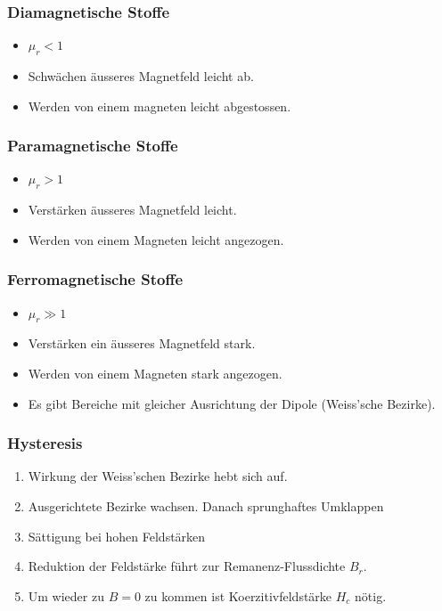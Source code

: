 \documentclass[10pt,a4paper]{scrartcl}
\begin{document}
\begin{multicols*}{3}
	\subsubsection{Diamagnetische Stoffe}
	
	\begin{itemize}
	\compaq
	\item
	$\mu_r<1$
	\item
	Schwächen äusseres Magnetfeld leicht ab.
	\item
	Werden von einem magneten leicht abgestossen.
	\end{itemize}
	
	\subsubsection{Paramagnetische Stoffe}

	\begin{itemize}
	\compaq
	\item
	$\mu_r>1$
	\item
	Verstärken äusseres Magnetfeld leicht.
	\item
	Werden von einem Magneten leicht angezogen.
	\end{itemize}
	
	\subsubsection{Ferromagnetische Stoffe}

	\begin{itemize}
	\compaq
	\item
	$\mu_r\gg 1$
	\item
	Verstärken ein äusseres Magnetfeld stark.
	\item
	Werden von einem Magneten stark angezogen.
	\item
	Es gibt Bereiche mit gleicher Ausrichtung der Dipole (Weiss'sche Bezirke).
	\end{itemize}
	
	\columnbreak
	
	\subsubsection{Hysteresis}
	
	
	\begin{enumerate}
	\compaq
	\item
	Wirkung der Weiss'schen Bezirke hebt sich auf.
	\item
	Ausgerichtete Bezirke wachsen. Danach sprunghaftes Umklappen
	\item
	Sättigung bei hohen Feldstärken
	\item
	Reduktion der Feldstärke führt zur Remanenz-Flussdichte $B_r$.
	\item
	Um wieder zu $B = 0$ zu kommen ist Koerzitivfeldstärke $H_c$ nötig.
	\end{enumerate}
	

\end{multicols*}
\end{document}
